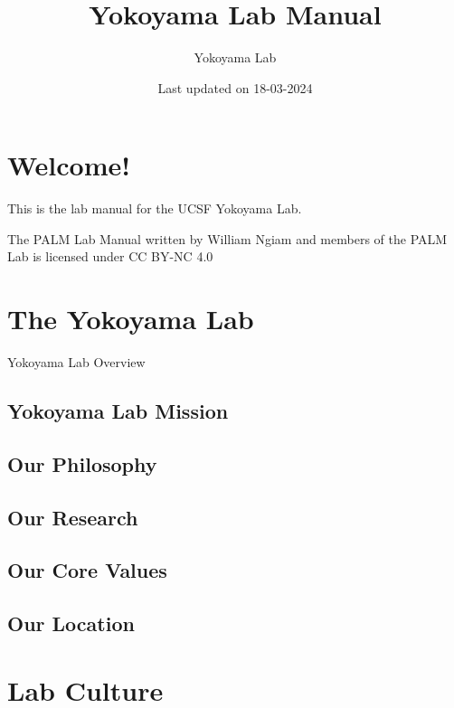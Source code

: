 \documentclass[
]{book}
\title{Yokoyama Lab Manual}
\author{Yokoyama Lab}
\date{Last updated on 18-03-2024}
\begin{document}
\maketitle

{
\setcounter{tocdepth}{1}
\tableofcontents
}
\hypertarget{welcome}{%
\chapter*{Welcome!}\label{welcome}}

This is the lab manual for the UCSF Yokoyama Lab.

The PALM Lab Manual written by William Ngiam and members of the PALM Lab is licensed under CC BY-NC 4.0

\hypertarget{the-lab}{%
\chapter{The Yokoyama Lab}\label{the-lab}}

Yokoyama Lab Overview

\hypertarget{lab-mission}{%
\section{Yokoyama Lab Mission}\label{lab-mission}}

\hypertarget{lab-philosophy}{%
\section{Our Philosophy}\label{lab-philosophy}}

\hypertarget{our-research}{%
\section{Our Research}\label{our-research}}

\hypertarget{lab-values}{%
\section{Our Core Values}\label{lab-values}}

\hypertarget{our-location}{%
\section{Our Location}\label{our-location}}

\hypertarget{lab-culture}{%
\chapter{Lab Culture}\label{lab-culture}}
\end{document}
